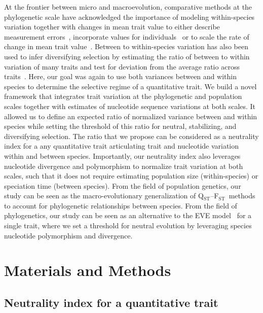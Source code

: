 \documentclass{article}
\newcommand{\Qst}{Q$_\text{ST}$}
\newcommand{\Fst}{F$_\text{ST}$}
\newcommand{\QstFst}{\Qst--\Fst}
\begin{document}
At the frontier between micro and macroevolution, comparative methods at the phylogenetic scale have acknowledged the importance of modeling within-species variation together with changes in mean trait value to either describe measurement errors~\parencite{lynch_methods_1991, hansen_interpreting_2012}, incorporate values for individuals~\parencite{felsenstein_comparative_2008} or to scale the rate of change in mean trait value~\parencite{kostikova_bridging_2016, gaboriau_multiplatform_2020, gaboriau_exploring_2023}.
Between to within-species variation has also been used to infer diversifying selection by estimating the ratio of between to within variation of many traits and test for deviation from the average ratio across traits~\parencite{rohlfs_modeling_2014, rohlfs_phylogenetic_2015}.
Here, our goal was again to use both variances between and within species to determine the selective regime of a quantitative trait.
We build a novel framework that integrates trait variation at the phylogenetic and population scales together with estimates of nucleotide sequence variations at both scales.
It allowed us to define an expected ratio of normalized variance between and within species while setting the threshold of this ratio for neutral, stabilizing, and diversifying selection.
The ratio that we propose can be considered as a neutrality index for a any quantitative trait articulating trait and nucleotide variation within and between species.
Importantly, our neutrality index also leverages nucleotide divergence and polymorphism to normalize trait variation at both scales, such that it does not require estimating population size (within-species) or speciation time (between species).
From the field of population genetics, our study can be seen as the macro-evolutionary generalization of \QstFst\ methods to account for phylogenetic relationships between species.
From the field of phylogenetics, our study can be seen as an alternative to the EVE model~\parencite{rohlfs_modeling_2014, rohlfs_phylogenetic_2015} for a single trait, where we set a threshold for neutral evolution by leveraging species nucleotide polymorphism and divergence.


\section{Materials and Methods}\label{sec:materials-and-methods}
\subsection{Neutrality index for a quantitative trait}\label{subsec:neutrality-index-for-a-quantitative-trait}
\end{document}
